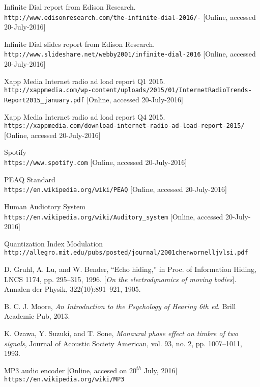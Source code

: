 \documentclass[a4paper, 13pt, oneside]{Thesis}  %
\begin{document}
\begin{thebibliography}{9}
Infinite Dial report from Edison Research.
\\\texttt{http://www.edisonresearch.com/the-infinite-dial-2016/-}
[Online, accessed 20-July-2016]

Infinite Dial slides report from Edison Research.
\\\texttt{http://www.slideshare.net/webby2001/infinite-dial-2016}
[Online, accessed 20-July-2016]

Xapp Media Internet radio ad load report Q1 2015.
\\\texttt{http://xappmedia.com/wp-content/uploads/2015/01/Internet\-{}Radio\-{}Trends-Report\-{}2015\_{}january.pdf}
[Online, accessed 20-July-2016]

Xapp Media Internet radio ad load report Q4 2015.
\\\texttt{https://xappmedia.com/download-internet-radio-ad-load-report-2015/}
[Online, accessed 20-July-2016]

Spotify
\\\texttt{https://www.spotify.com}
[Online, accessed 20-July-2016]

PEAQ Standard
\\\texttt{https://en.wikipedia.org/wiki/PEAQ}
[Online, accessed 20-July-2016]

Human Audiotory System
\\\texttt{https://en.wikipedia.org/wiki/Auditory\_{}system}
[Online, accessed 20-July-2016]

Quantization Index Modulation
\\\texttt{http://allegro.mit.edu/pubs/posted/journal/2001\-{}chen\-{}wornell\-{}jvlsi.pdf}

D. Gruhl, A. Lu, and W. Bender, “Echo hiding,” in Proc. of Information Hiding,
LNCS 1174, pp. 295–315, 1996.
[\textit{On the electrodynamics of moving bodies}]. 
Annalen der Physik, 322(10):891–921, 1905.
 
B. C. J. Moore, \textit{An Introduction to the Psychology of Hearing 6th ed}. Brill Academic
Pub, 2013.

K. Ozawa, Y. Suzuki, and T. Sone, \textit{Monaural phase effect on timbre of two signals}, Journal of Acoustic Society American, vol. 93, no. 2, pp. 1007–1011, 1993.

MP3 audio encoder [Online, accesed on \(20^{th}\) July, 2016]
\\\texttt{https://en.wikipedia.org/wiki/MP3}


\end{thebibliography}
\end{document}
